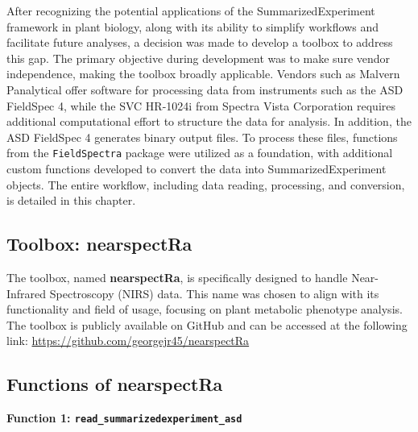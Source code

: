 \documentclass[12pt,a4paper]{report}
\begin{document}
After recognizing the potential applications of the SummarizedExperiment framework in plant biology, along with its ability to simplify workflows and facilitate future analyses, a decision was made to develop a toolbox to address this gap. The primary objective during development was to make sure vendor independence, making the toolbox broadly applicable. Vendors 
such as Malvern Panalytical offer software for processing data from instruments such as the ASD FieldSpec 4, while the SVC HR-1024i from Spectra Vista Corporation requires additional computational effort to structure the data for analysis.
In addition, the ASD FieldSpec 4 generates binary output files. To process these files, functions from the \texttt{FieldSpectra} package were utilized as a foundation, with additional custom functions developed to convert the data into SummarizedExperiment objects. The entire workflow, including data reading, processing, and conversion, is detailed in this chapter.\\

\subsection{Toolbox: nearspectRa}
The toolbox, named \textbf{nearspectRa}, is specifically designed to handle  Near-Infrared Spectroscopy (NIRS) data. This name was chosen to align with its functionality and field of usage, focusing on plant metabolic phenotype analysis. The toolbox is publicly available on GitHub and can be accessed at the following link: \url{https://github.com/georgejr45/nearspectRa}\\


\subsection{Functions of nearspectRa}
\textbf{Function 1: \texttt{read\_summarizedexperiment\_asd}} \\
\end{document}
